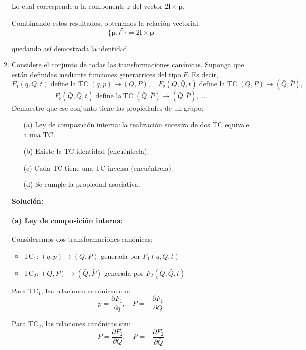 \documentclass[12pt]{article}
\begin{document}
\begin{enumerate}
  Lo cual corresponde a la componente $z$ del vector $2\mathbf{l}\times\mathbf{p}$.

  Combinando estos resultados, obtenemos la relación vectorial:
  \[
  \{\mathbf{p}, l^2\} = 2\mathbf{l}\times\mathbf{p}
  \]

  quedando así demostrada la identidad.

  \item Considere el conjunto de todas las transformaciones canónicas. Suponga que están 
    definidas mediante funciones generatrices del tipo \(F\). Es decir,
    \[
      F_1(q,Q,t)\;\text{define la TC}\;(q,p)\to(Q,P), 
      \quad
      F_2(Q,\bar Q,t)\;\text{define la TC}\;(Q,P)\to(\bar Q,\bar P), 
    \]
    \[
      F_3(\bar Q,\bar{\bar Q},t)\;\text{define la TC}\;(\bar Q,\bar P)\to(\bar{\bar Q},\bar{\bar P}), 
      \;\dots
    \]
    Demuestre que ese conjunto tiene las propiedades de un grupo:
    \begin{enumerate}
      \item[(a)] Ley de composición interna: la realización sucesiva de dos TC equivale a una TC.
      \item[(b)] Existe la TC identidad (encuéntrela).
      \item[(c)] Cada TC tiene una TC inversa (encuéntrela).
      \item[(d)] Se cumple la propiedad asociativa.
    \end{enumerate}

  \textbf{Solución:}

  \paragraph{(a) Ley de composición interna:}

  Consideremos dos transformaciones canónicas:
  \begin{itemize}
      \item TC$_1$: $(q,p) \to (Q,P)$ generada por $F_1(q,Q,t)$
      \item TC$_2$: $(Q,P) \to (\bar{Q},\bar{P})$ generada por $F_2(Q,\bar{Q},t)$
  \end{itemize}

  Para TC$_1$, las relaciones canónicas son:
  \[
  p = \frac{\partial F_1}{\partial q}, \quad P = -\frac{\partial F_1}{\partial Q}
  \]

  Para TC$_2$, las relaciones canónicas son:
  \[
  P = \frac{\partial F_2}{\partial Q}, \quad \bar{P} = -\frac{\partial F_2}{\partial \bar{Q}}
  \]


\end{enumerate}
\end{document}

